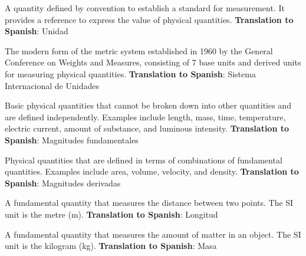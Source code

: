 \begin{vocabulary}[Unit]
A quantity defined by convention to establish a standard for measurement. It provides a reference to express the value of physical quantities. \newline
\textbf{Translation to Spanish}: Unidad \newline
\end{vocabulary}

\begin{vocabulary}
The modern form of the metric system established in 1960 by the General Conference on Weights and Measures, consisting of 7 base units and derived units for measuring physical quantities. \newline
\textbf{Translation to Spanish}: Sistema Internacional de Unidades \newline
\end{vocabulary}

\begin{vocabulary}
Basic physical quantities that cannot be broken down into other quantities and are defined independently. Examples include length, mass, time, temperature, electric current, amount of substance, and luminous intensity. \newline
\textbf{Translation to Spanish}: Magnitudes fundamentales \newline
\end{vocabulary}

\begin{vocabulary}
Physical quantities that are defined in terms of combinations of fundamental quantities. Examples include area, volume, velocity, and density. \newline
\textbf{Translation to Spanish}: Magnitudes derivadas \newline
\end{vocabulary}

\begin{vocabulary}[Length]
A fundamental quantity that measures the distance between two points. The SI unit is the metre (m). \newline
\textbf{Translation to Spanish}: Longitud \newline
\end{vocabulary}

\begin{vocabulary}[Mass]
A fundamental quantity that measures the amount of matter in an object. The SI unit is the kilogram (kg). \newline
\textbf{Translation to Spanish}: Masa \newline
\end{vocabulary}


